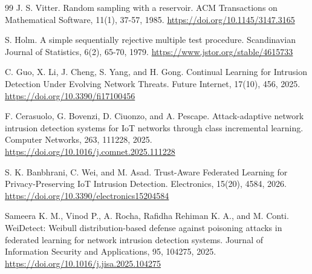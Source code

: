 \documentclass[
  10pt,
  a4paper,
]{article}
\begin{document}
\begin{thebibliography}{99}
 J. S. Vitter. Random sampling with a reservoir. ACM Transactions on Mathematical Software, 11(1), 37-57, 1985. \url{https://doi.org/10.1145/3147.3165}

 S. Holm. A simple sequentially rejective multiple test procedure. Scandinavian Journal of Statistics, 6(2), 65-70, 1979. \url{https://www.jstor.org/stable/4615733}

 C. Guo, X. Li, J. Cheng, S. Yang, and H. Gong. Continual Learning for Intrusion Detection Under Evolving Network Threats. Future Internet, 17(10), 456, 2025. \url{https://doi.org/10.3390/fi17100456}

 F. Cerasuolo, G. Bovenzi, D. Ciuonzo, and A. Pescape. Attack-adaptive network intrusion detection systems for IoT networks through class incremental learning. Computer Networks, 263, 111228, 2025. \url{https://doi.org/10.1016/j.comnet.2025.111228}

 S. K. Banbhrani, C. Wei, and M. Asad. Trust-Aware Federated Learning for Privacy-Preserving IoT Intrusion Detection. Electronics, 15(20), 4584, 2026. \url{https://doi.org/10.3390/electronics15204584}

 Sameera K. M., Vinod P., A. Rocha, Rafidha Rehiman K. A., and M. Conti. WeiDetect: Weibull distribution-based defense against poisoning attacks in federated learning for network intrusion detection systems. Journal of Information Security and Applications, 95, 104275, 2025. \url{https://doi.org/10.1016/j.jisa.2025.104275}
\end{thebibliography}
\end{document}

